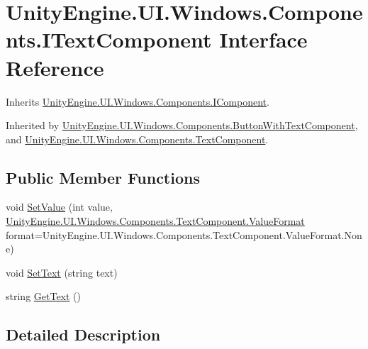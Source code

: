 \hypertarget{interface_unity_engine_1_1_u_i_1_1_windows_1_1_components_1_1_i_text_component}{}\section{Unity\+Engine.\+U\+I.\+Windows.\+Components.\+I\+Text\+Component Interface Reference}
\label{interface_unity_engine_1_1_u_i_1_1_windows_1_1_components_1_1_i_text_component}


Inherits \hyperlink{interface_unity_engine_1_1_u_i_1_1_windows_1_1_components_1_1_i_component}{Unity\+Engine.\+U\+I.\+Windows.\+Components.\+I\+Component}.



Inherited by \hyperlink{class_unity_engine_1_1_u_i_1_1_windows_1_1_components_1_1_button_with_text_component}{Unity\+Engine.\+U\+I.\+Windows.\+Components.\+Button\+With\+Text\+Component}, and \hyperlink{class_unity_engine_1_1_u_i_1_1_windows_1_1_components_1_1_text_component}{Unity\+Engine.\+U\+I.\+Windows.\+Components.\+Text\+Component}.

\subsection*{Public Member Functions}
\begin{DoxyCompactItemize}
\item 
void \hyperlink{interface_unity_engine_1_1_u_i_1_1_windows_1_1_components_1_1_i_text_component_aae23d1d982557de1b36421d09a3b886a}{Set\+Value} (int value, \hyperlink{class_unity_engine_1_1_u_i_1_1_windows_1_1_components_1_1_text_component_adf4a7bac85dfe1b32ebe6309e5386f89}{Unity\+Engine.\+U\+I.\+Windows.\+Components.\+Text\+Component.\+Value\+Format} format=Unity\+Engine.\+U\+I.\+Windows.\+Components.\+Text\+Component.\+Value\+Format.\+None)
\item 
void \hyperlink{interface_unity_engine_1_1_u_i_1_1_windows_1_1_components_1_1_i_text_component_a5ac8198143f56a19871c085ab6d812ee}{Set\+Text} (string text)
\item 
string \hyperlink{interface_unity_engine_1_1_u_i_1_1_windows_1_1_components_1_1_i_text_component_ac7c965968aa6dbd507db4f46ee07aeed}{Get\+Text} ()
\end{DoxyCompactItemize}


\subsection{Detailed Description}



